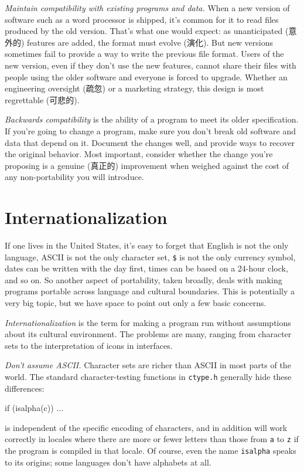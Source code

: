 \emph{Maintain compatibility with existing programs and data.} When a new
version of software such as a word processor is shipped, it's common for it
to read files produced by the old version. That's what one would expect: as
unanticipated (意外的) features are added, the format must evolve (演化).
But new versions sometimes fail to provide a way to write the previous file
format. Users of the new version, even if they don't use the new features,
cannot share their files with people using the older software and everyone
is forced to upgrade. Whether an engineering oversight (疏忽) or a
marketing strategy, this design is most regrettable (可悲的).

\textit{Backwards compatibility} is the ability of a program to meet its
older specification.  If you're going to change a program, make sure you
don't break old software and data that depend on it. Document the changes
well, and provide ways to recover the original behavior. Most important,
consider whether the change you're proposing is a genuine (真正的)
improvement when weighed against the cost of any non-portability you will
introduce.

\section{Internationalization}
\label{sec:internationalization}

If one lives in the United States, it's easy to forget that English is not
the only language, ASCII is not the only character set, \verb'$' is not the
only currency symbol, dates can be written with the day first, times can be
based on a 24-hour clock, and so on. So another aspect of portability,
taken broadly, deals with making programs portable across language and
cultural boundaries. This is potentially a very big topic, but we have
space to point out only a few basic concerns.

\textit{Internationalization} is the term for making a program run without
assumptions about its cultural environment. The problems are many, ranging
from character sets to the interpretation of icons in interfaces.

\emph{Don't assume ASCII.} Character sets are richer than ASCII in most
parts of the world.  The standard character-testing functions in
\verb'ctype.h' generally hide these differences:
\begin{wellcode}
    if (isalpha(c)) ...
\end{wellcode}
is independent of the specific encoding of characters, and in addition will
work correctly in locales where there are more or fewer letters than those
from \verb'a' to \verb'z' if the program is compiled in that locale. Of
course, even the name \verb'isalpha' speaks to its origins; some languages
don't have alphabets at all.

